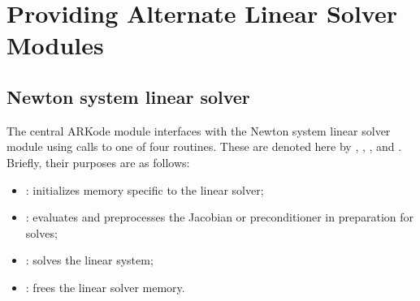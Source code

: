 \documentclass[letterpaper,10pt,english]{sphinxmanual}
\begin{document}
\section{Providing Alternate Linear Solver Modules}
\label{linear_solvers/custom:providing-alternate-linear-solver-modules}\label{linear_solvers/custom::doc}\label{linear_solvers/custom:linearsolvers-custom}

\subsection{Newton system linear solver}
\label{linear_solvers/custom:newton-system-linear-solver}
The central ARKode module interfaces with the Newton system linear
solver module using calls to one of four routines. These are denoted
here by {\hyperref[linear_solvers/custom:c.linit]{\emph{}}}, {\hyperref[linear_solvers/custom:c.lsetup]{\emph{}}}, {\hyperref[linear_solvers/custom:c.lsolve]{\emph{}}}, and
{\hyperref[linear_solvers/custom:c.lfree]{\emph{}}}. Briefly, their purposes are as follows:
\begin{itemize}
\item {} 
{\hyperref[linear_solvers/custom:c.linit]{\emph{}}}: initializes memory specific to the linear solver;

\item {} 
{\hyperref[linear_solvers/custom:c.lsetup]{\emph{}}}: evaluates and preprocesses the Jacobian or
preconditioner in preparation for solves;

\item {} 
{\hyperref[linear_solvers/custom:c.lsolve]{\emph{}}}: solves the linear system;

\item {} 
{\hyperref[linear_solvers/custom:c.lfree]{\emph{}}}: frees the linear solver memory.

\end{itemize}
\end{document}
